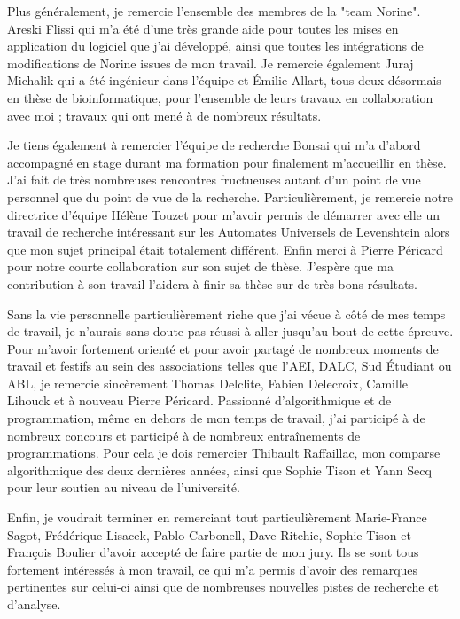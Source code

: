 \documentclass[12pt]{LHSV_thesis}
\begin{document}
Plus généralement, je remercie l'ensemble des membres de la "team Norine".
Areski Flissi qui m'a été d'une très grande aide pour toutes les mises en application du logiciel que j'ai développé, ainsi que toutes les intégrations de modifications de Norine issues de mon travail.
Je remercie également Juraj Michalik qui a été ingénieur dans l'équipe et Émilie Allart, tous deux désormais en thèse de bioinformatique, pour l'ensemble de leurs travaux en collaboration avec moi ; travaux qui ont mené à de nombreux résultats.

Je tiens également à remercier l'équipe de recherche Bonsai qui m'a d'abord accompagné en stage durant ma formation pour finalement m'accueillir en thèse.
J'ai fait de très nombreuses rencontres fructueuses autant d'un point de vue personnel que du point de vue de la recherche.
Particulièrement, je remercie notre directrice d'équipe Hélène Touzet pour m'avoir permis de démarrer avec elle un travail de recherche intéressant sur les Automates Universels de Levenshtein alors que mon sujet principal était totalement différent.
Enfin merci à Pierre Péricard pour notre courte collaboration sur son sujet de thèse.
J'espère que ma contribution à son travail l'aidera à finir sa thèse sur de très bons résultats.

Sans la vie personnelle particulièrement riche que j'ai vécue à côté de mes temps de travail, je n'aurais sans doute pas réussi à aller jusqu'au bout de cette épreuve.
Pour m'avoir fortement orienté et pour avoir partagé de nombreux moments de travail et festifs au sein des associations telles que l'AEI, DALC, Sud Étudiant ou ABL, je remercie sincèrement Thomas Delclite, Fabien Delecroix, Camille Lihouck et à nouveau Pierre Péricard.
Passionné d'algorithmique et de programmation, même en dehors de mon temps de travail, j'ai participé à de nombreux concours et participé à de nombreux entraînements de programmations.
Pour cela je dois remercier Thibault Raffaillac, mon comparse algorithmique des deux dernières années, ainsi que Sophie Tison et Yann Secq pour leur soutien au niveau de l'université.

Enfin, je voudrait terminer en remerciant tout particulièrement Marie-France Sagot, Frédérique Lisacek, Pablo Carbonell, Dave Ritchie, Sophie Tison et François Boulier d'avoir accepté de faire partie de mon jury.
Ils se sont tous fortement intéressés à mon travail, ce qui m'a permis d'avoir des remarques pertinentes sur celui-ci ainsi que de nombreuses nouvelles pistes de recherche et d'analyse.
\end{document}
